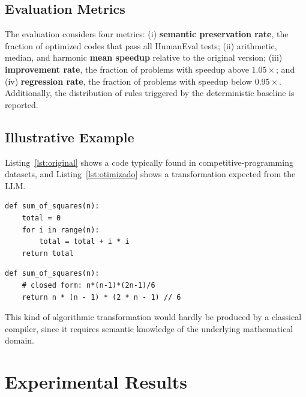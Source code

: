 \documentclass[conference]{IEEEtran}
\begin{document}
\subsection{Evaluation Metrics}
The evaluation considers four metrics: (i) \textbf{semantic preservation rate}, the fraction of optimized codes that pass all HumanEval tests; (ii) arithmetic, median, and harmonic \textbf{mean speedup} relative to the original version; (iii) \textbf{improvement rate}, the fraction of problems with speedup above $1.05\times$; and (iv) \textbf{regression rate}, the fraction of problems with speedup below $0.95\times$. Additionally, the distribution of rules triggered by the deterministic baseline is reported.

\subsection{Illustrative Example}
Listing~\ref{lst:original} shows a code typically found in competitive-programming datasets, and Listing~\ref{lst:otimizado} shows a transformation expected from the LLM.

\par\medskip\noindent
\begin{minipage}{\columnwidth}
\begin{lstlisting}[caption={Original code with explicit loop.}, label={lst:original}]
def sum_of_squares(n):
    total = 0
    for i in range(n):
        total = total + i * i
    return total
\end{lstlisting}
\end{minipage}\par\medskip

\par\medskip\noindent
\begin{minipage}{\columnwidth}
\begin{lstlisting}[caption={Optimized version suggested by the LLM.}, label={lst:otimizado}]
def sum_of_squares(n):
    # closed form: n*(n-1)*(2n-1)/6
    return n * (n - 1) * (2 * n - 1) // 6
\end{lstlisting}
\end{minipage}\par\medskip

This kind of algorithmic transformation would hardly be produced by a classical compiler, since it requires semantic knowledge of the underlying mathematical domain.

\section{Experimental Results}
\label{sec:resultados}
\end{document}
